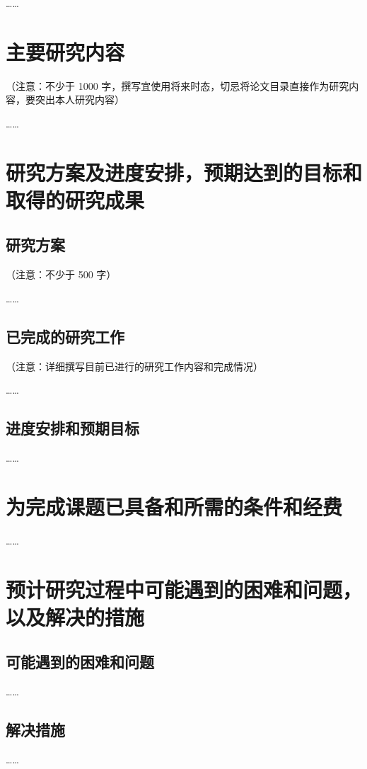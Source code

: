 ……

\section{主要研究内容}

（注意：不少于 1000 字，撰写宜使用将来时态，切忌将论文目录直接作为研究内容，要突出本人研究内容）

……

\section{研究方案及进度安排，预期达到的目标和取得的研究成果}

\subsection{研究方案}

（注意：不少于 500 字）

……

\subsection{已完成的研究工作}

（注意：详细撰写目前已进行的研究工作内容和完成情况）

……

\subsection{进度安排和预期目标}

……

\section{为完成课题已具备和所需的条件和经费}

……

\section{预计研究过程中可能遇到的困难和问题，以及解决的措施}

\subsection{可能遇到的困难和问题}

……

\subsection{解决措施}

……
